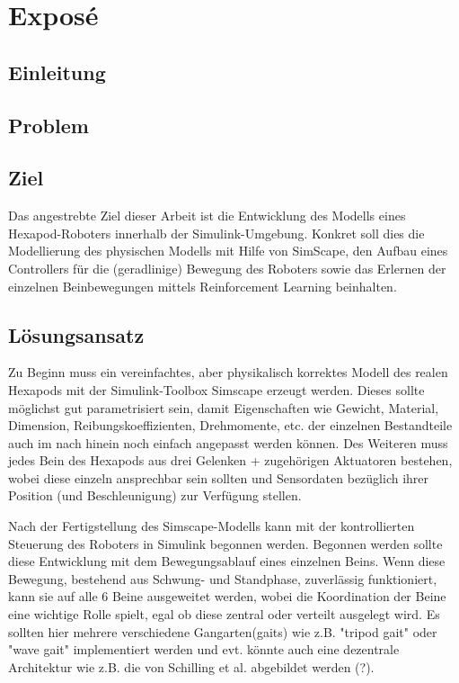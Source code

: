 \chapter{Exposé}
\label{ch:expose}



\section{Einleitung}

\section{Problem}

\section{Ziel}
Das angestrebte Ziel dieser Arbeit ist die Entwicklung des Modells eines Hexapod-Roboters innerhalb der Simulink-Umgebung.
Konkret soll dies die Modellierung des physischen Modells mit Hilfe von SimScape, den Aufbau eines Controllers für die (geradlinige) Bewegung des Roboters sowie das Erlernen der einzelnen Beinbewegungen mittels Reinforcement Learning beinhalten.

\section{Lösungsansatz}
Zu Beginn muss ein vereinfachtes, aber physikalisch korrektes Modell des realen Hexapods mit der Simulink-Toolbox Simscape erzeugt werden.
Dieses sollte möglichst gut parametrisiert sein, damit Eigenschaften wie Gewicht, Material, Dimension, Reibungskoeffizienten, Drehmomente, etc. der einzelnen Bestandteile auch im nach hinein noch einfach angepasst werden können.
Des Weiteren muss jedes Bein des Hexapods aus drei Gelenken + zugehörigen Aktuatoren bestehen, wobei diese einzeln ansprechbar sein sollten und Sensordaten bezüglich ihrer Position (und Beschleunigung) zur Verfügung stellen.

Nach der Fertigstellung des Simscape-Modells kann mit der kontrollierten Steuerung des Roboters in Simulink begonnen werden.
Begonnen werden sollte diese Entwicklung mit dem Bewegungsablauf eines einzelnen Beins.
Wenn diese Bewegung, bestehend aus Schwung- und Standphase, zuverlässig funktioniert, kann sie auf alle 6 Beine ausgeweitet werden, wobei die Koordination der Beine eine wichtige Rolle spielt, egal ob diese zentral oder verteilt ausgelegt wird.
Es sollten hier mehrere verschiedene Gangarten(gaits) wie z.B. "tripod gait" oder "wave gait" implementiert werden und evt. könnte auch eine dezentrale Architektur wie z.B. die von Schilling et al. abgebildet werden (?).

